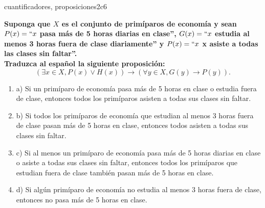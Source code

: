 \documentclass{article}
\begin{document}
\begin{question}{43}{cuantificadores, proposiciones}{2}{c}{6}{
\textbf{Suponga que $X$ es el conjunto de primíparos de economía y sean $P(x)=``x$ pasa más de 5 horas diarias en clase'', $G(x)=``x$ estudia al menos 3 horas fuera de clase diariamente'' y $P(x)=``x$ x asiste a todas las clases sin faltar''.}\\

\textbf{Traduzca al español la siguiente proposición:}
\[
(\exists x \in X, P(x) \lor H(x)) \rightarrow (\forall y \in X, G(y) \rightarrow P(y)).
\]

\begin{enumerate}
\item a) Si un primíparo de economía pasa más de 5 horas en clase o estudia fuera de clase, entonces todos los primíparos asisten a todas sus clases sin faltar.
\item b) Si todos los primíparos de economía que estudian al menos 3 horas fuera de clase pasan más de 5 horas en clase, entonces todos asisten a todas sus clases sin faltar.
\item c) Si al menos un primíparo de economía pasa más de 5 horas diarias en clase o asiste a todas sus clases sin faltar, entonces todos los primíparos que estudian fuera de clase también pasan más de 5 horas en clase.
\item d) Si algún primíparo de economía no estudia al menos 3 horas fuera de clase, entonces no pasa más de 5 horas en clase.
\end{enumerate}
}
\end{question}
\end{document}
